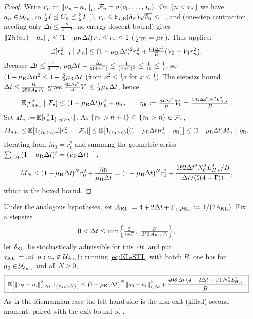 \begin{proof}
Write $r_n:=\left\lVert a_n-a_\star\right\rVert_\star$, $\mathcal{F}_n=\sigma(a_0,\dots,a_n)$. On $\{n<\tau_{\mathrm{R}}\}$ we have
$a_n\in\mathcal{U}_{\delta_{\mathrm{R}}}$, so $\tfrac12I\preceq C_n\preceq\tfrac32I$ (),
$r_n\leq\mathfrak b_{\star,\mathrm{R}}(\delta_{\mathrm{R}})\sqrt{\delta_{\mathrm{R}}}\leq1$, and 
(one-step contraction, needing only $\Delta t\leq\tfrac2{4+\Gamma}$, no energy-descent bound)
gives $\left\lVert T_{\mathrm{R}}(a_n)-a_\star\right\rVert_\star\leq(1-\mu_{\mathrm{R}}\Delta t)\,r_n\leq r_n\leq1$
($\tfrac12\gamma_{\mathrm{R}}=\mu_{\mathrm{R}}$). Thus
 applies:
\[
    \mathbb{E}[r_{n+1}^2\mid\mathcal{F}_n]\leq(1-\mu_{\mathrm{R}}\Delta t)^2r_n^2+\tfrac{64\Delta t^2}B\bigl(V_0+V_1r_n^2\bigr).
\]
Because $\Delta t\leq\tfrac2{4+\Gamma}$, $\mu_{\mathrm{R}}\Delta t=\tfrac{\Delta t}{2(4+\Gamma)}\leq\tfrac1{(4+\Gamma)^2}\leq\tfrac1{16}\leq\tfrac12$,
so $(1-\mu_{\mathrm{R}}\Delta t)^2\leq1-\tfrac32\mu_{\mathrm{R}}\Delta t$ (from $x^2\leq\tfrac12 x$ for $x\leq\tfrac12$).
The stepsize bound $\Delta t\leq\tfrac{B}{256A_{\mathrm{R}}V_1}$ gives $\tfrac{64\Delta t^2}BV_1\leq\tfrac12\mu_{\mathrm{R}}\Delta t$,
hence
\[
    \mathbb{E}[r_{n+1}^2\mid\mathcal{F}_n]\leq(1-\mu_{\mathrm{R}}\Delta t)r_n^2+\eta_{\mathrm{R}},
    \qquad \eta_{\mathrm{R}}:=\tfrac{64\Delta t^2}BV_0=\tfrac{192\Delta t^2N_\theta^2L_{H,\star}^2}{B}.
\]
Set $M_n:=\mathbb{E}[r_n^2\mathbf1_{\{\tau_{\mathrm{R}}>n\}}]$. As $\{\tau_{\mathrm{R}}>n+1\}\subseteq\{\tau_{\mathrm{R}}>n\}\in\mathcal{F}_n$,
\[
    M_{n+1}\leq\mathbb{E}\bigl[\mathbf1_{\{\tau_{\mathrm{R}}>n\}}\mathbb{E}[r_{n+1}^2\mid\mathcal{F}_n]\bigr]
    \leq\mathbb{E}\bigl[\mathbf1_{\{\tau_{\mathrm{R}}>n\}}\bigl((1-\mu_{\mathrm{R}}\Delta t)r_n^2+\eta_{\mathrm{R}}\bigr)\bigr]
    \leq(1-\mu_{\mathrm{R}}\Delta t)M_n+\eta_{\mathrm{R}}.
\]
Iterating from $M_0=r_0^2$ and summing the geometric series $\sum_{j\geq0}(1-\mu_{\mathrm{R}}\Delta t)^j=(\mu_{\mathrm{R}}\Delta t)^{-1}$,
\[
    M_N\leq(1-\mu_{\mathrm{R}}\Delta t)^Nr_0^2+\frac{\eta_{\mathrm{R}}}{\mu_{\mathrm{R}}\Delta t}
    =(1-\mu_{\mathrm{R}}\Delta t)^Nr_0^2+\frac{192\Delta t^2N_\theta^2L_{H,\star}^2/B}{\Delta t/(2(4+\Gamma))},
\]
which is the boxed bound.
\end{proof}

\begin{theorem}
\label{thm:stoch-local-KL}
Under the analogous hypotheses, set $A_{\mathrm{KL}}:=4+2\Delta t+\Gamma$, $\mu_{\mathrm{KL}}:=1/(2A_{\mathrm{KL}})$. Fix a
stepsize
\[
    0<\Delta t\leq\min\Bigl\{\tfrac2{4+\Gamma},\ \tfrac{B}{272\,A_{\KL}\,V_1}\Bigr\},
\]
let $\delta_{\mathrm{KL}}$ be stochastically admissible for this $\Delta t$, and put $\tau_{\mathrm{KL}}:=\inf\{n:a_n\notin\mathcal{U}_{\delta_{\mathrm{KL}}}\}$;
running \eqref{eq:KL-STL} with batch $B$, one has for $a_0\in\mathcal{U}_{\delta_{\mathrm{KL}}}$ and all $N\geq0$,
\[
    \boxed{\;
    \mathbb{E}\bigl[\left\lVert a_N-a_\star\right\rVert_{\star,\Delta t}^2\,\mathbf 1_{\{\tau_{\mathrm{KL}}>N\}}\bigr]
    \leq\bigl(1-\mu_{\mathrm{KL}}\Delta t\bigr)^N\left\lVert a_0-a_\star\right\rVert_{\star,\Delta t}^2
    +\frac{408\,\Delta t\,(4+2\Delta t+\Gamma)\,N_\theta^2L_{H,\star}^2}{B}.
    \;}
\]
As in the Riemannian case the left-hand side is the non-exit (killed) second moment, paired with the
exit bound of .
\end{theorem}

